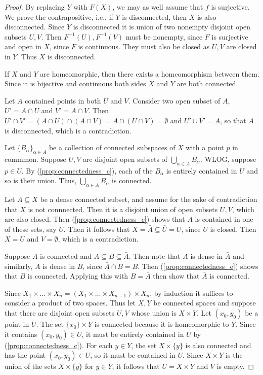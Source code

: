 \documentclass[11pt,a4paper]{article}
\begin{document}
\begin{proof}
\highlight{(\ref{prop:connectedness_a})} By replacing $Y$ with $F(X)$, we may as well assume that $f$ is surjective. We prove the contrapositive, i.e., if $Y$ is disconnected, then $X$ is also disconnected. Since $Y$ is disconnected it is union of two nonempty disjoint open subsets $U, V$. Then $F^{-1}(U), F^{-1}(V)$ must be nonempty, since $F$ is surjective and open in $X$, since $F$ is continuous. They must also be closed as $U, V$ are closed in $Y$. Thus $X$ is disconnected.

\highlight{(\ref{prop:connectedness_b})} If $X$ and $Y$ are homeomorphic, then there exists a homeomorphism between them. Since it is bijective and continuous both sides $X$ and $Y$ are both connected.

\highlight{(\ref{prop:connectedness_c})} Let $A$ contained points in both $U$ and $V$. Consider two open subset of $A$, $U' = A\cap U$ and $V' = A\cap V$. Then $U'\cap V' = (A\cap U)\cap (A\cap V) = A\cap(U\cap V) = \emptyset$ and $U'\cup V' = A$, so that $A$ is disconnected, which is a contradiction.

\highlight{(\ref{prop:connectedness_d})} Let $\{B_\alpha\}_{\alpha\in A}$ be a collection of connected subspaces of $X$ with a point $p$ in commmon. Suppose $U, V$ are disjoint open subsets of $\bigcup_{\alpha\in A}B_\alpha$. WLOG, suppose $p\in U$. By (\ref{prop:connectedness_c}), each of the $B_\alpha$ is entirely contained in $U$ and so is their union. Thus, $\bigcup_{\alpha\in A}B_\alpha$ is connected.

\highlight{(\ref{prop:connectedness_e})} Let $A\subseteq X$ be a dense connected subset, and assume for the sake of contradiction that $X$ is not connnected. Then it is a disjoint union of open subsets $U,V$, which are also closed. Then (\ref{prop:connectedness_c}) shows that $A$ is contained in one of these sets, say $U$. Then it follows that $X = \bar{A}\subseteq \bar{U} = U$, since $U$ is closed. Then $X = U$ and $V=\emptyset$, which is a contradiction. 

\highlight{(\ref{prop:connectedness_f})} Suppose $A$ is connected and $A\subseteq B\subseteq \bar{A}$. Then note that $A$ is dense in $\bar{A}$ and similarly, $A$ is dense in $B$, since $\bar{A}\cap B = B$. Then (\ref{prop:connectedness_e}) shows that $B$ is connected. Applying this with $B = \bar{A}$ then show that $\bar{A}$ is connected.

\highlight{(\ref{prop:connectedness_g})} Since $X_1\times\ldots\times X_n = (X_1\times\ldots\times X_{n-1})\times X_n$, by induction it suffices to consider a product of two spaces. Thus let $X,Y$ be connected spaces and suppose that there are disjoint open subsets $U,V$ whose union is $X\times Y$. Let $(x_0,y_0)$ be a point in $U$. 
The set $\{x_0\}\times Y$ is connected because it is homeomorphic to $Y$. Since it contains $(x_0,y_0)\in U$, it must be entirely contained in $U$ by (\ref{prop:connectedness_c}). For each $y\in Y$, the set $X\times \{y\}$ is also connected and has the point $(x_0,y_0)\in U$, so it must be contained in $U$. Since $X\times Y$ is the union of the sets $X\times \{y\}$ for $y\in Y$, it follows that $U = X\times Y$ and $V$ is empty.


\end{proof}
\end{document}
